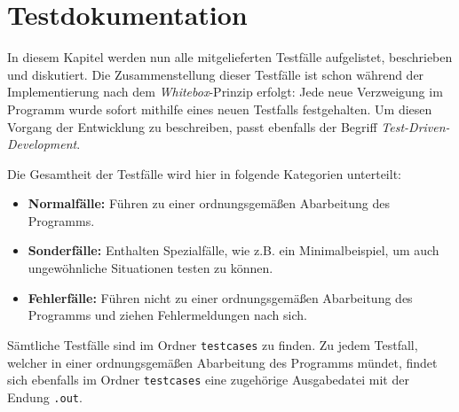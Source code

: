 \chapter{Testdokumentation}
\label{Testdokumentation}

In diesem Kapitel werden nun alle mitgelieferten Testf\"alle
aufgelistet, beschrieben und diskutiert. Die Zusammenstellung dieser
Testf\"alle ist schon w\"ahrend der Implementierung nach dem
\textit{Whitebox}-Prinzip erfolgt: Jede neue Verzweigung im Programm
wurde sofort mithilfe eines neuen Testfalls festgehalten. Um diesen
Vorgang der Entwicklung zu beschreiben, passt ebenfalls der Begriff
\textit{Test-Driven-Development}.

Die Gesamtheit der Testf\"alle wird hier in folgende Kategorien
unterteilt:
\begin{itemize}
  \item \textbf{Normalf\"alle:} F\"uhren zu einer ordnungsgem\"a{\ss}en
    Abarbeitung des Programms.
  \item \textbf{Sonderf\"alle:} Enthalten Spezialf\"alle, wie z.B. ein
    Minimalbeispiel, um auch ungew\"ohnliche Situationen testen zu
    k\"onnen.
  \item \textbf{Fehlerf\"alle:} F\"uhren nicht zu einer
    ordnungsgem\"a{\ss}en Abarbeitung des Programms und ziehen
    Fehlermeldungen nach sich.
\end{itemize}
S\"amtliche Testf\"alle sind im Ordner \texttt{testcases} zu finden.
Zu jedem Testfall, welcher in einer ordnungsgem\"a{\ss}en Abarbeitung
des Programms m\"undet, findet sich ebenfalls im Ordner
\texttt{testcases} eine zugeh\"orige Ausgabedatei mit der Endung
\texttt{.out}.

